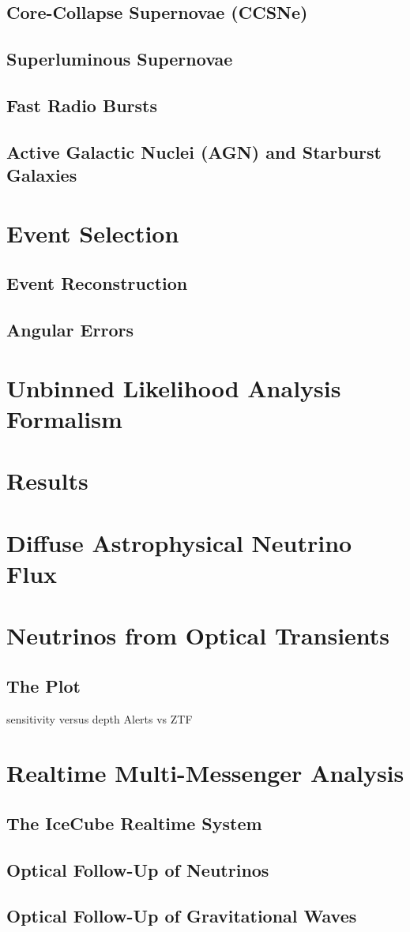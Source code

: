 \documentclass[]{article}
\begin{document}
\subsection{Core-Collapse Supernovae (CCSNe)}

\subsection{Superluminous Supernovae}

\subsection{Fast Radio Bursts}

\subsection{Active Galactic Nuclei (AGN) and Starburst Galaxies}

\section{Event Selection}

\subsection{Event Reconstruction}
\subsection{Angular Errors}
\section{Unbinned Likelihood Analysis Formalism}

\section{Results}
\section{Diffuse Astrophysical Neutrino Flux}

\section{Neutrinos from Optical Transients}
\subsection{The Plot}
sensitivity versus depth
Alerts vs ZTF

\section{Realtime Multi-Messenger Analysis}
\subsection{The IceCube Realtime System}
\subsection{Optical Follow-Up of Neutrinos}

\subsection{Optical Follow-Up of Gravitational Waves}
\end{document}
